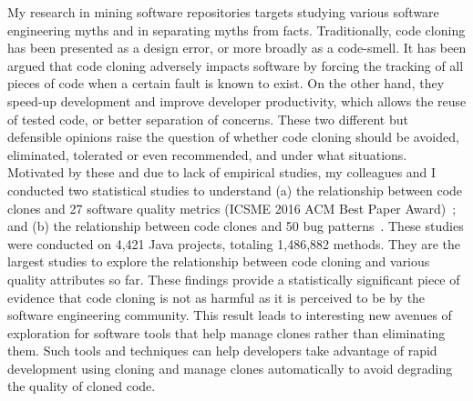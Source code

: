 \documentclass[a4paper]{article}
\begin{document}
My research in mining software repositories targets studying various
software engineering myths and in separating myths from facts. 
Traditionally, code cloning has been presented as a design error, or more broadly as a code-smell. It has been argued that
code cloning adversely impacts software by forcing the tracking of all pieces of code when a
certain fault is known to exist. On the other hand, they speed-up development and improve developer productivity,
which allows the reuse of tested code, or better separation of concerns. These two different but
defensible opinions raise the question of whether code cloning should be avoided, eliminated,
tolerated or even recommended, and under what situations. 
Motivated by these and due to lack of empirical studies, my colleagues and I conducted two statistical
studies to understand (a) the relationship between code clones and 27 software quality metrics
(ICSME 2016 ACM Best Paper Award)~\cite{quality-clones}; and (b) the relationship between code clones and 50 bug
patterns~\cite{bugpatterns}. These studies were conducted on 4,421 Java projects, totaling
1,486,882 methods. They are the largest studies to explore the
relationship between code cloning and various quality attributes so far. 
These findings provide a statistically significant piece of evidence that code cloning is not as
harmful as it is perceived to be by the software engineering community. This result leads to
interesting new avenues of exploration for software tools that help manage clones rather than
eliminating them. Such tools and techniques can help developers take advantage of rapid
development using cloning and manage clones automatically to avoid degrading the quality of
cloned code. 
\end{document}
